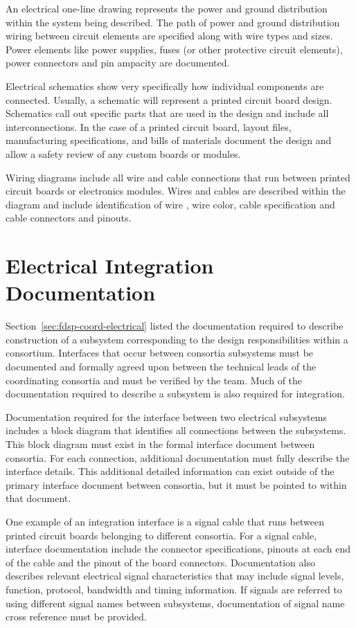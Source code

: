 An electrical one-line drawing represents the power and ground
distribution within the system being described.  The path of power and
ground distribution wiring between circuit elements are
specified along with wire types and sizes.  Power elements like power supplies, fuses (or other protective circuit elements),
power connectors and pin ampacity are documented.


Electrical schematics show very specifically how individual
components are connected.  Usually, a schematic will represent a
printed circuit board design.  Schematics call out specific
parts that are used in the design and include all interconnections.
In the case of a printed circuit board, layout files, manufacturing
specifications, and bills of materials document
the design and allow a safety review of any custom boards or
modules.


Wiring diagrams include all wire and cable connections that
run between printed circuit boards or electronics modules.  Wires and
cables are described within the diagram and
include identification of wire , wire color, cable specification
and cable connectors and pinouts.




\section{Electrical Integration Documentation}
\label{sec:fdsp-coord-integ-electrical}

Section~\ref{sec:fdsp-coord-electrical} listed the documentation
required to describe construction of a subsystem corresponding to the
design responsibilities within a consortium.  Interfaces that occur
between consortia subsystems must be documented and formally agreed
upon between the technical leads of the coordinating consortia and
must be verified by the  team.  Much of the
documentation required to describe a subsystem is also required for
integration.


Documentation required for the interface between two electrical
subsystems includes a block diagram that identifies all connections
between the subsystems.  This block diagram must exist in the formal
interface document between consortia.  For each connection, additional
documentation must fully describe the interface
details. This additional detailed information can exist outside of the
primary interface document between consortia, but it must be pointed
to within that document.


One example of an integration interface is a signal cable that runs
between printed circuit boards belonging to different consortia.  For
a signal cable, interface documentation include the connector
specifications, pinouts at each end of the cable and the pinout of the
board connectors.  Documentation also describes
relevant electrical signal characteristics that may include signal
levels, function, protocol, bandwidth and timing information.  If
signals are referred to using different signal names between
subsystems, documentation of signal name cross reference must be
provided.


